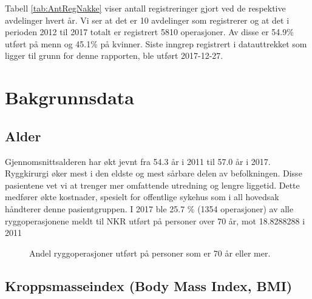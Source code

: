 \documentclass [norsk,a4paper,twoside]{article}\usepackage[]{graphicx}\usepackage[]{color}
\begin{document}
Tabell \ref{tab:AntRegNakke} viser antall 
registreringer gjort ved de respektive avdelinger hvert år. Vi ser at det er  
10 avdelinger som registrerer og at det i perioden 2012 til 2017 totalt er registrert 5810 
operasjoner. Av disse er 54.9\% utført på menn og 45.1\% på kvinner.
Siste inngrep registrert i datauttrekket som ligger til grunn for denne rapporten, ble utført 
2017-12-27. 
\par


\clearpage



\section{Bakgrunnsdata}


\subsection{Alder}




Gjennomsnittsalderen har økt jevnt fra 54.3 år 
i 2011 til 57.0 år i 2017. 
Ryggkirurgi øker mest i den eldste og mest sårbare delen av
befolkningen. Disse pasientene vet vi at trenger mer omfattende utredning og
lengre liggetid. Dette medfører økte kostnader, spesielt for offentlige sykehus som i
all hovedsak håndterer denne pasientgruppen. I 2017 ble 25.7 \% 
(1354 
operasjoner) av alle
ryggoperasjonene meldt til NKR utført på personer over 70 år, mot 18.8288288 
i 2011 

\begin{figure}[ht]
\caption{\label{fig:Alder70} Andel ryggoperasjoner utført på personer som er 70 år eller mer.}
\end{figure}





\subsection{Kroppsmasseindex (Body Mass Index, BMI)}
\end{document}
